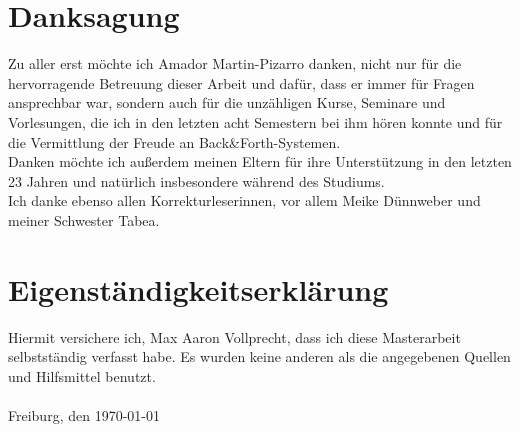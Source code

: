 \chapter*{Danksagung}
Zu aller erst möchte ich Amador Martin-Pizarro danken, nicht nur für die hervorragende Betreuung dieser Arbeit und dafür, dass er immer für Fragen ansprechbar war, sondern auch für die unzähligen Kurse, Seminare und Vorlesungen, die ich in den letzten acht Semestern bei ihm hören konnte und für die Vermittlung der Freude an Back\&Forth-Systemen.\\
Danken möchte ich außerdem meinen Eltern für ihre Unterstützung in den letzten 23 Jahren und natürlich insbesondere während des Studiums.\\
Ich danke ebenso allen Korrekturleserinnen, vor allem Meike Dünnweber und meiner Schwester Tabea.
\chapter*{Eigenständigkeitserklärung}
\vspace{0.8cm}
Hiermit versichere ich, Max Aaron Vollprecht, dass ich diese Masterarbeit selbstständig verfasst habe. Es wurden keine anderen als die angegebenen Quellen und Hilfsmittel benutzt.
\\ \\
Freiburg, den \today

\newpage
\thispagestyle{empty}
\mbox{}
\newpage

